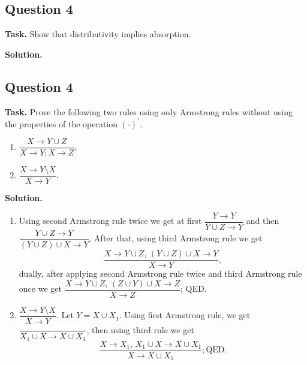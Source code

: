 \documentclass[14pt,a4paper]{extarticle}
\begin{document}
	\newpage
	\subsection*{Question 4}
	
	\noindent\textbf{Task.}  Show that distributivity implies absorption.
	
	\noindent\textbf{Solution.} 
	
	\newpage
	\subsection*{Question 4}
	
	\noindent\textbf{Task.}  Prove the following two rules using only Armstrong rules without using the properties of the operation $(\cdot)^\prime$.
	\begin{enumerate}
		\item $\dfrac{X\rightarrow Y\cup Z}{X\rightarrow Y; X\rightarrow Z}$,
		\item $\dfrac{X \rightarrow Y\setminus X}{X \rightarrow Y}$.
	\end{enumerate}
	\noindent\textbf{Solution.} 
	\begin{enumerate}
		\item Using second Armstrong rule twice we get at first $\dfrac{Y\rightarrow Y}{Y\cup Z\rightarrow Y}$ and then $\dfrac{Y\cup Z\rightarrow Y}{(Y\cup Z) \cup X\rightarrow Y}$. After that, using third Armstrong rule we get 
		\[\dfrac{X\rightarrow Y\cup Z,\, (Y \cup Z) \cup X \rightarrow Y}{X\rightarrow Y},\]
		dually, after applying second Armstrong rule twice and third Armstrong rule once we get $\dfrac{X\rightarrow Y\cup Z,\, (Z \cup Y) \cup X \rightarrow Z}{X\rightarrow Z}$; QED.
		\item $\dfrac{X \rightarrow Y\setminus X}{X \rightarrow Y}$. Let $Y=X\cup X_1$. Using first Armstrong rule, we get $\dfrac{}{X_1\cup X\rightarrow X\cup X_1}$, then using third rule we get 
		\[\dfrac{X\rightarrow X_1,\, X_1\cup X\rightarrow X\cup X_1}{X\rightarrow X\cup X_1}; \text{QED}.\]
	\end{enumerate}
\end{document}
